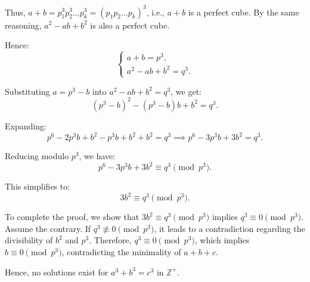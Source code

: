 \documentclass{article}
\begin{document}
Thus, \(a+b = p_1^3p_2^3 \dots p_k^3 = (p_1p_2 \dots p_k)^3\), i.e., \(a+b\) is a perfect cube. By the same reasoning, \(a^2 - ab + b^2\) is also a perfect cube.

Hence:
\[
\begin{cases}
a + b = p^3, \\
a^2 - ab + b^2 = q^3.
\end{cases}
\]

Substituting \(a = p^3 - b\) into \(a^2 - ab + b^2 = q^3\), we get:
\[
(p^3 - b)^2 - (p^3 - b)b + b^2 = q^3.
\]

Expanding:
\[
p^6 - 2p^3b + b^2 - p^3b + b^2 + b^2 = q^3 \implies p^6 - 3p^3b + 3b^2 = q^3.
\]

Reducing modulo \(p^3\), we have:
\[
p^6 - 3p^3b + 3b^2 \equiv q^3 \pmod{p^3}.
\]

This simplifies to:
\[
3b^2 \equiv q^3 \pmod{p^3}.
\]

To complete the proof, we show that \(3b^2 \equiv q^3 \pmod{p^3}\) implies \(q^3 \equiv 0 \pmod{p^3}\). Assume the contrary. If \(q^3 \not\equiv 0 \pmod{p^3}\), it leads to a contradiction regarding the divisibility of \(b^2\) and \(p^3\). Therefore, \(q^3 \equiv 0 \pmod{p^3}\), which implies \(b \equiv 0 \pmod{p^3}\), contradicting the minimality of \(a+b+c\).

Hence, no solutions exist for \(a^3 + b^3 = c^3\) in \(\mathbb{Z}^+\).
\end{document}
